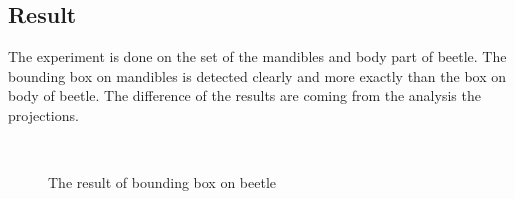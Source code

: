 \subsection{Result}
The experiment is done on the set of the mandibles and body part of beetle. The bounding box on mandibles is detected clearly and more exactly than the box on body of beetle. The difference of the results are coming from the analysis the projections. 
\begin{figure}[h!]
\centering
{}~~
\caption{The result of bounding box on beetle}
\label{figrboxes}
\end{figure}~\\[0.2cm]
